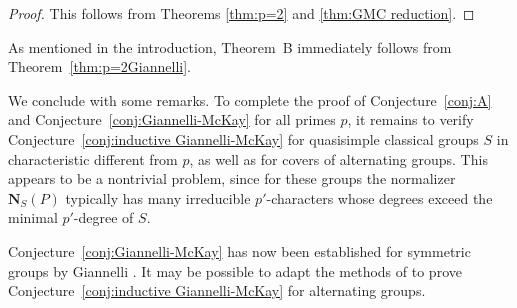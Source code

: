 \documentclass[12pt]{amsart}
\theoremstyle{plain}
\theoremstyle{definition}
\numberwithin{equation}{section}
\newcommand{\bN}{\mathbf{N}}
\begin{document}
\begin{proof}
This follows from Theorems \ref{thm:p=2} and \ref{thm:GMC
reduction}.
\end{proof}

As mentioned in the introduction, Theorem~B immediately follows from
Theorem~\ref{thm:p=2Giannelli}.

We conclude with some remarks. To complete the proof of
Conjecture~\ref{conj:A} and Conjecture~\ref{conj:Giannelli-McKay}
for all primes $p$, it remains to verify
Conjecture~\ref{conj:inductive Giannelli-McKay} for quasisimple
classical groups $S$ in characteristic different from $p$, as well
as for covers of alternating groups. This appears to be a nontrivial
problem, since for these groups the normalizer $\bN_S(P)$ typically
has many irreducible $p'$-characters whose degrees exceed the
minimal $p'$-degree of $S$.

Conjecture~\ref{conj:Giannelli-McKay} has now been established for
symmetric groups by Giannelli \cite{G}. It may be possible to adapt
the methods of \cite{G} to prove Conjecture~\ref{conj:inductive
Giannelli-McKay} for alternating groups.


\end{document}
